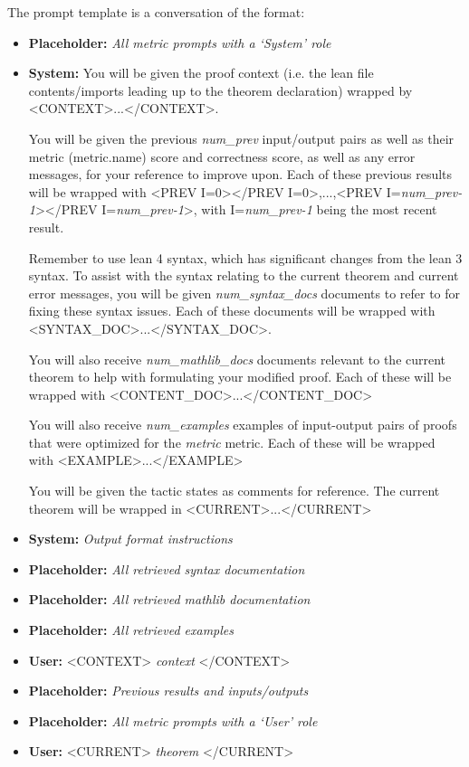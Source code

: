 The prompt template is a conversation of the format:
\begin{itemize}
    \item[] \textbf{Placeholder:} \textit{All metric prompts with a `System' role}
    \item[] \textbf{System:} You will be given the proof context (i.e. the lean file contents/imports leading up to the theorem declaration) wrapped by <CONTEXT>...</CONTEXT>. 
    
    You will be given the previous \textit{num\_prev} input/output pairs as well as their metric ({metric.name}) score and correctness score, as well as any error messages, for your reference to improve upon. Each of these previous results will be wrapped with <PREV I=0></PREV I=0>,...,<PREV I=\textit{num\_prev-1}></PREV I=\textit{num\_prev-1}>, with I=\textit{num\_prev-1} being the most recent result.
    
    Remember to use lean 4 syntax, which has significant changes from the lean 3 syntax. 
    To assist with the syntax relating to the current theorem and current error messages, you will be given \textit{num\_syntax\_docs} documents to refer to for fixing these syntax issues. Each of these documents will be wrapped with <SYNTAX\_DOC>...</SYNTAX\_DOC>.
    
    You will also receive \textit{num\_mathlib\_docs} documents relevant to the current theorem to help with formulating your modified proof. Each of these will be wrapped with <CONTENT\_DOC>...</CONTENT\_DOC>

    You will also receive \textit{num\_examples} examples of input-output pairs of proofs that were optimized for the \textit{metric} metric. Each of these will be wrapped with <EXAMPLE>...</EXAMPLE>
    
    You will be given the tactic states as comments for reference.
    The current theorem will be wrapped in <CURRENT>...</CURRENT>
    \item[]\textbf{System:} \textit{Output format instructions}
    \item[]\textbf{Placeholder:} \textit{All retrieved syntax documentation}
    \item[]\textbf{Placeholder:} \textit{All retrieved mathlib documentation}
    \item[]\textbf{Placeholder:} \textit{All retrieved examples}
    \item[]\textbf{User:} <CONTEXT>
                    \textit{context}
                  </CONTEXT>
    \item[]\textbf{Placeholder:} \textit{Previous results and inputs/outputs}
    \item[]\textbf{Placeholder:} \textit{All metric prompts with a `User' role}
    \item[]\textbf{User:} <CURRENT>
                    \textit{theorem}
                  </CURRENT>
\end{itemize}

